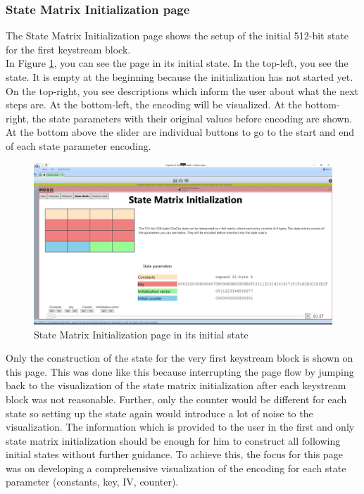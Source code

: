 \subsubsection{State Matrix Initialization page}

The State Matrix Initialization page shows the setup of the initial 512-bit state for the first keystream block. \\
In Figure \ref{fig:statematrixpage}, you can see the page in its initial state. In the top-left, you see the state. It is empty at the beginning because the initialization has not started yet. On the top-right, you see descriptions which inform the user about what the next steps are. At the bottom-left, the encoding will be visualized. At the bottom-right, the state parameters with their original values before encoding are shown. At the bottom above the slider are individual buttons to go to the start and end of each state parameter encoding.

\begin{figure}
\centering
\includegraphics[width=\textwidth]{figures/ct2/all-pages/4-statematrix.png}
\caption{State Matrix Initialization page in its initial state}
\label{fig:statematrixpage}
\end{figure}

Only the construction of the state for the very first keystream block is shown on this page. This was done like this because interrupting the page flow by jumping back to the visualization of the state matrix initialization after each keystream block was not reasonable. Further, only the counter would be different for each state so setting up the state again would introduce a lot of noise to the visualization. The information which is provided to the user in the first and only state matrix initialization should be enough for him to construct all following initial states without further guidance. To achieve this, the focus for this page was on developing a comprehensive visualization of the encoding for each state parameter (constants, key, IV, counter).

